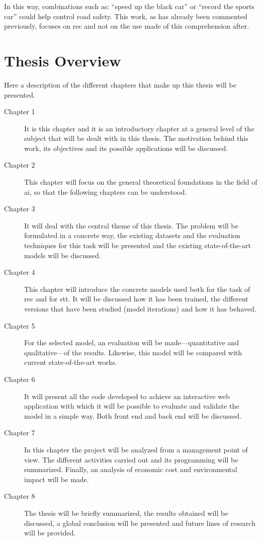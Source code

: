 In this way, combinations such as: ``speed up the black car'' or ``record the
sports car'' could help control road safety. This work, as has already been
commented previously, focuses on \gls{rec} and not on the use made of this
comprehension after.



\section{Thesis Overview}

Here a description of the different chapters that make up this thesis will be
presented.

\begin{description}
  \item[Chapter 1] It is this chapter and it is an introductory chapter at a
  general level of the subject that will be dealt with in this thesis. The
  motivation behind this work, its objectives and its possible applications
  will be discussed. 
  \item[Chapter 2] This chapter will focus on the general theoretical
  foundations in the field of \gls{ai}, so that the following chapters can be
  understood. 
  \item[Chapter 3] It will deal with the central theme of this thesis. The
  problem will be formulated in a concrete way, the existing datasets and the
  evaluation techniques for this task will be presented and the existing
  state-of-the-art models will be discussed. 
  \item[Chapter 4] This chapter will introduce the concrete models used both
  for the task of \gls{rec} and for \gls{stt}. It will be discussed how it has
  been trained, the different versions that have been studied (model
  iterations) and how it has behaved. 
  \item[Chapter 5] For the selected model, an evaluation will be
  made---quantitative and qualitative---of the results. Likewise, this model
  will be compared with current state-of-the-art works. 
  \item[Chapter 6] It will present all the code developed to achieve an
  interactive web application with which it will be possible to evaluate and
  validate the model in a simple way. Both front end and back end will be
  discussed. 
  \item[Chapter 7] In this chapter the project will be analyzed from a
  management point of view. The different activities carried out and its
  programming will be summarized. Finally, an analysis of economic cost and
  environmental impact will be made. 
  \item[Chapter 8] The thesis will be briefly summarized, the results obtained
  will be discussed, a global conclusion will be presented and future lines of
  research will be provided. 
\end{description}

